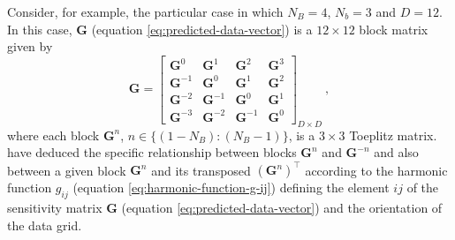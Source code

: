 Consider, for example, the particular case in which $N_{B} = 4$, $N_{b} = 3$ and $D = 12$. In this case,
$\mathbf{G}$ (equation \ref{eq:predicted-data-vector}) is a $12 \times 12$ block matrix given by
\begin{equation}
	\mathbf{G} = \begin{bmatrix}
		\mathbf{G}^{0} & \mathbf{G}^{1} & \mathbf{G}^{2} & \mathbf{G}^{3} \\
		\mathbf{G}^{-1} & \mathbf{G}^{0} & \mathbf{G}^{1} & \mathbf{G}^{2} \\
		\mathbf{G}^{-2} & \mathbf{G}^{-1} & \mathbf{G}^{0} & \mathbf{G}^{1} \\
		\mathbf{G}^{-3} & \mathbf{G}^{-2} & \mathbf{G}^{-1} & \mathbf{G}^{0}
	\end{bmatrix}_{D \times D} \: ,
	\label{eq:matrix-G-BTTB}
\end{equation}
where each block $\mathbf{G}^{n}$, $n \in \{ (1 - N_{B}) : (N_{B} - 1) \}$, is a $3 \times 3$ Toeplitz matrix.
\citet{takahashi-etal2020, takahashi-etal2022} have deduced the specific relationship between blocks $\mathbf{G}^{n}$
and $\mathbf{G}^{-n}$ and also between a given block $\mathbf{G}^{n}$ and its transposed $\left(\mathbf{G}^{n}\right)^{\top}$
according to the harmonic function $g_{ij}$ (equation \ref{eq:harmonic-function-g-ij}) defining the element $ij$ of
the sensitivity matrix $\mathbf{G}$ (equation \ref{eq:predicted-data-vector}) and the orientation of the data grid.

